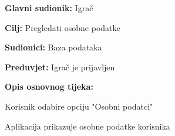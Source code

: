 					
					\noindent {}
					\begin{packed_item}
					
					\item \textbf{Glavni sudionik: }Igrač
					\item  \textbf{Cilj:} Pregledati osobne podatke
					\item  \textbf{Sudionici:} Baza podataka
					\item  \textbf{Preduvjet:} Igrač je prijavljen
					\item  \textbf{Opis osnovnog tijeka:}
					
					\item[] \begin{packed_enum}
						
						\item Korisnik odabire opciju "Osobni podatci"
						\item Aplikacija prikazuje osobne podatke korisnika
					\end{packed_enum}
					\end{packed_item}
			
